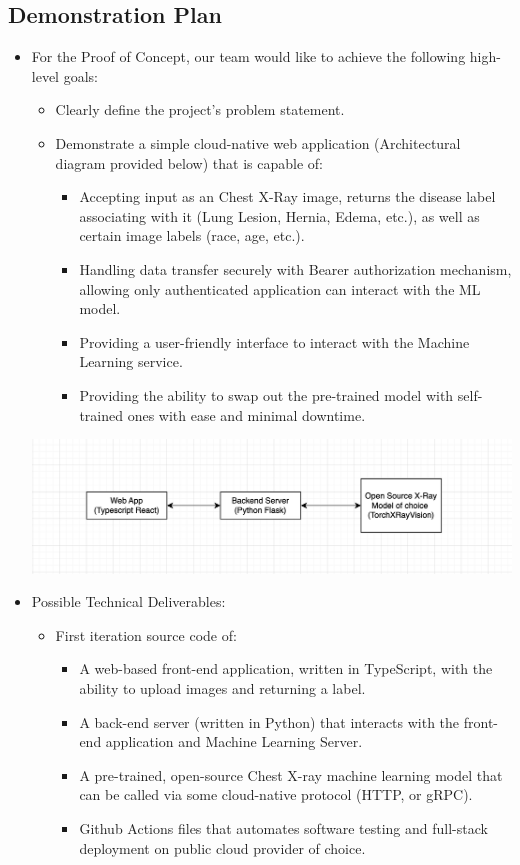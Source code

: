 \documentclass{article}
\begin{document}
\subsection{Demonstration Plan}
\begin{itemize}
    \item For the Proof of Concept, our team would like to achieve the following high-level goals:
    \begin{itemize}
        \item Clearly define the project's problem statement.
        \item Demonstrate a simple cloud-native web application (Architectural diagram provided below) that is capable of:
        \begin{itemize}
            \item Accepting input as an Chest X-Ray image, returns the disease label associating with it (Lung Lesion, Hernia, Edema, etc.), as well as certain image labels (race, age, etc.).
            \item Handling data transfer securely with Bearer authorization mechanism, allowing only authenticated application can interact with the ML model.
            \item Providing a user-friendly interface to interact with the Machine Learning service.
            \item Providing the ability to swap out the pre-trained model with self-trained ones with ease and minimal downtime.
        \end{itemize}
    \end{itemize}
    \includegraphics[scale=0.45]{poc-architectural-diagram.png}
    
    \item Possible Technical Deliverables:
    \begin{itemize}
        \item First iteration source code of:
        \begin{itemize}
            \item A web-based front-end application, written in TypeScript, with the ability to upload images and returning a label.
            \item A back-end server (written in Python) that interacts with the front-end application and Machine Learning Server.
            \item A pre-trained, open-source Chest X-ray machine learning model that can be called via some cloud-native protocol (HTTP, or gRPC).
            \item Github Actions files that automates software testing and full-stack deployment on public cloud provider of choice.
        \end{itemize}
    \end{itemize}
\end{itemize}
\newpage
\end{document}
